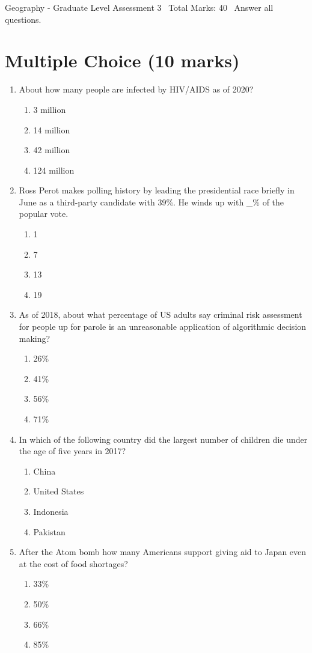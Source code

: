 \documentclass[12pt]{article}
\begin{document}
\begin{center}
Geography - Graduate Level Assessment 3 \
Total Marks: 40 \
Answer all questions.
\end{center}

\section*{Multiple Choice (10 marks)}
\begin{enumerate}[label=\arabic*.]
\item About how many people are infected by HIV/AIDS as of 2020?
\begin{enumerate}[label=(\alph*)]
    \item 3 million
    \item 14 million
    \item 42 million
    \item 124 million
\end{enumerate}
\item Ross Perot makes polling history by leading the presidential race briefly in June as a third-party candidate with 39\%. He winds up with \_\% of the popular vote.
\begin{enumerate}[label=(\alph*)]
    \item 1
    \item 7
    \item 13
    \item 19
\end{enumerate}
\item As of 2018, about what percentage of US adults say criminal risk assessment for people up for parole is an unreasonable application of algorithmic decision making?
\begin{enumerate}[label=(\alph*)]
    \item 26\%
    \item 41\%
    \item 56\%
    \item 71\%
\end{enumerate}
\item In which of the following country did the largest number of children die under the age of five years in 2017?
\begin{enumerate}[label=(\alph*)]
    \item China
    \item United States
    \item Indonesia
    \item Pakistan
\end{enumerate}
\item After the Atom bomb how many Americans support giving aid to Japan even at the cost of food shortages?
\begin{enumerate}[label=(\alph*)]
    \item 33\%
    \item 50\%
    \item 66\%
    \item 85\%
\end{enumerate}
\end{enumerate}
\end{document}
